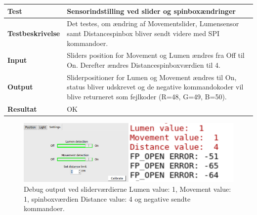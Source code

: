 \begin{table}[H]
\begin{tabular}{|l|l|}\hline
\textbf{Test} & Sensorindstilling ved slider og spinboxændringer \\\hline

\textbf{Testbeskrivelse} & \multicolumn{1}{|m{11.5cm}|}{Det testes, om ændring af Movementslider, Lumensensor samt Distancespinbox bliver sendt videre med SPI kommandoer.} \\\hline

\textbf{Input} & \multicolumn{1}{|m{11.5cm}|}{Sliders position for Movement og Lumen ændres fra Off til On. Derefter ændres Distancespinboxværdien til 4.} \\\hline

\textbf{Output} & \multicolumn{1}{|m{11.5cm}|}{ Sliderpositioner for Lumen og Movement ændres til On, status bliver udskrevet og de negative kommandokoder vil blive returneret som fejlkoder (R=48, G=49, B=50).} \\\hline

\textbf{Resultat} & \multicolumn{1}{|m{11.5cm}|}{ OK} \\\hline

\end{tabular}
\end{table}

\begin{figure}[H]
\centering
\includegraphics[width=1.0\linewidth]{0_Filer/Figuer/testSettings.png}
\caption{Debug output ved sliderværdierne Lumen value: 1, Movement value: 1, spinboxværdien Distance value: 4 og negative sendte kommandoer.}
\label{fig:testSettings}
\end{figure}



